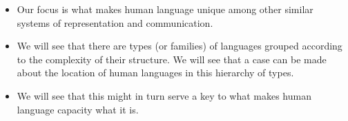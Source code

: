 \documentclass[11pt]{article}
\begin{document}
\begin{itemize}
\item Our focus is what makes human language unique among other similar
systems of representation and communication. 

\item We will see that there are types (or families) of languages grouped
according to the complexity of their structure.  We will see that a case can be
made about the location of human languages in this hierarchy of types.

\item We will see that this might in turn serve a key to what makes human
language capacity what it is.

\end{itemize}
\end{document}
